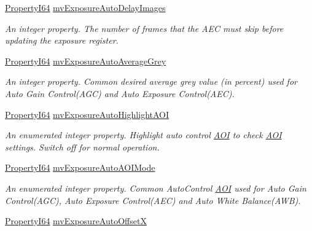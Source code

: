 \begin{DoxyCompactItemize}
\hyperlink{group___common_interface_ga81749b2696755513663492664a18a893}{Property\+I64} \hyperlink{classmv_i_m_p_a_c_t_1_1acquire_1_1_gen_i_cam_1_1_acquisition_control_a5e1471f52a0be9d3d97ef955846577b2}{mv\+Exposure\+Auto\+Delay\+Images}
\begin{DoxyCompactList}\small\item\em An integer property. The number of frames that the A\+E\+C must skip before updating the exposure register. \end{DoxyCompactList}\item 
\hyperlink{group___common_interface_ga81749b2696755513663492664a18a893}{Property\+I64} \hyperlink{classmv_i_m_p_a_c_t_1_1acquire_1_1_gen_i_cam_1_1_acquisition_control_abfe22d85a47e70a4735bf7c496757f6c}{mv\+Exposure\+Auto\+Average\+Grey}
\begin{DoxyCompactList}\small\item\em An integer property. Common desired average grey value (in percent) used for Auto Gain Control(\+A\+G\+C) and Auto Exposure Control(\+A\+E\+C). \end{DoxyCompactList}\item 
\hyperlink{group___common_interface_ga81749b2696755513663492664a18a893}{Property\+I64} \hyperlink{classmv_i_m_p_a_c_t_1_1acquire_1_1_gen_i_cam_1_1_acquisition_control_aac9696f4ac67e8d763e65018ba2853e3}{mv\+Exposure\+Auto\+Highlight\+A\+O\+I}
\begin{DoxyCompactList}\small\item\em An enumerated integer property. Highlight auto control \hyperlink{struct_a_o_i}{A\+O\+I} to check \hyperlink{struct_a_o_i}{A\+O\+I} settings. Switch off for normal operation. \end{DoxyCompactList}\item 
\hyperlink{group___common_interface_ga81749b2696755513663492664a18a893}{Property\+I64} \hyperlink{classmv_i_m_p_a_c_t_1_1acquire_1_1_gen_i_cam_1_1_acquisition_control_a3121267e92f554eb04e266b80032ca66}{mv\+Exposure\+Auto\+A\+O\+I\+Mode}
\begin{DoxyCompactList}\small\item\em An enumerated integer property. Common Auto\+Control \hyperlink{struct_a_o_i}{A\+O\+I} used for Auto Gain Control(\+A\+G\+C), Auto Exposure Control(\+A\+E\+C) and Auto White Balance(\+A\+W\+B). \end{DoxyCompactList}\item 
\hyperlink{group___common_interface_ga81749b2696755513663492664a18a893}{Property\+I64} \hyperlink{classmv_i_m_p_a_c_t_1_1acquire_1_1_gen_i_cam_1_1_acquisition_control_abe7efb253397a6338ecc8ccdf91d518e}{mv\+Exposure\+Auto\+Offset\+X}

\end{DoxyCompactItemize}
